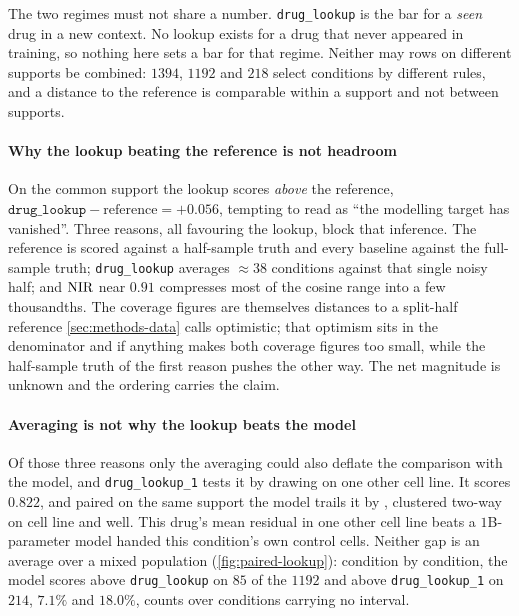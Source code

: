 \begin{scopelimit}
The two regimes must not share a number. \texttt{drug\_lookup} is the bar for a
\emph{seen} drug in a new context. No lookup exists for a drug that never
appeared in training, so nothing here sets a bar for that regime. Neither may
rows on different supports be combined: $\num{1394}$, $\num{1192}$ and
$\num{218}$ select conditions by different rules, and a distance to the reference
is comparable within a support and not between supports.
\end{scopelimit}

\paragraph{Why the lookup beating the reference is not headroom} On the common
support the lookup scores \emph{above} the reference,
$\texttt{drug\_lookup} - \textrm{reference} = +0.056$, tempting to read as ``the
modelling target has vanished''. Three reasons, all favouring the lookup, block
that inference. The reference is scored against a half-sample truth and every
baseline against the full-sample truth; \texttt{drug\_lookup} averages
$\approx 38$ conditions against that single noisy half; and $\textrm{NIR}$ near $0.91$
compresses most of the cosine range into a few thousandths. The coverage figures
are themselves distances to a split-half reference \cref{sec:methods-data} calls
optimistic; that optimism sits in the denominator and if anything makes both
coverage figures too small, while the half-sample truth of the first reason
pushes the other way. The net magnitude is unknown and the ordering carries the
claim.

\paragraph{Averaging is not why the lookup beats the model} Of those three
reasons only the averaging could also deflate the comparison with the model, and
\texttt{drug\_lookup\_1} tests it by drawing on one other cell line. It scores
$0.822$, and paired on the same support the model trails it by
, clustered two-way on cell line and well. This
drug's mean residual in one other cell line beats a $1$B-parameter model handed
this condition's own control cells. Neither gap is an average over a mixed
population (\cref{fig:paired-lookup}): condition by condition, the model scores
above \texttt{drug\_lookup} on $85$ of the $\num{1192}$ and above
\texttt{drug\_lookup\_1} on $214$, $7.1\%$ and $18.0\%$, counts over conditions
carrying no interval.

